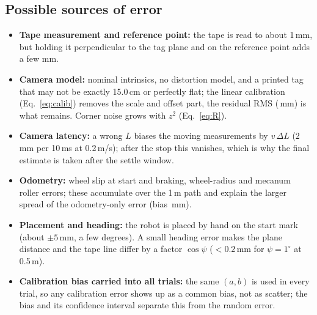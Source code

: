 \documentclass[11pt,a4paper]{article}
\begin{document}
\subsection{Possible sources of error}
\begin{itemize}
\item \textbf{Tape measurement and reference point:} the tape is read to about 1\,mm, but holding it perpendicular to the tag plane and on the reference point adds a few mm.
\item \textbf{Camera model:} nominal intrinsics, no distortion model, and a printed tag that may not be exactly 15.0\,cm or perfectly flat; the linear calibration (Eq.~\ref{eq:calib}) removes the scale and offset part, the residual RMS (\CalRMS\,mm) is what remains. Corner noise grows with $z^2$ (Eq.~\ref{eq:R}).
\item \textbf{Camera latency:} a wrong $L$ biases the moving measurements by $v\,\Delta L$ (2\,mm per 10\,ms at 0.2\,m/s); after the stop this vanishes, which is why the final estimate is taken after the settle window.
\item \textbf{Odometry:} wheel slip at start and braking, wheel-radius and mecanum roller errors; these accumulate over the 1\,m path and explain the larger spread of the odometry-only error (bias \ResOdomBias\,mm).
\item \textbf{Placement and heading:} the robot is placed by hand on the start mark (about $\pm5$\,mm, a few degrees). A small heading error makes the plane distance and the tape line differ by a factor $\cos\psi$ ($<0.2$\,mm for $\psi=1^\circ$ at 0.5\,m).
\item \textbf{Calibration bias carried into all trials:} the same $(a,b)$ is used in every trial, so any calibration error shows up as a common bias, not as scatter; the bias and its confidence interval separate this from the random error.
\end{itemize}
\end{document}
